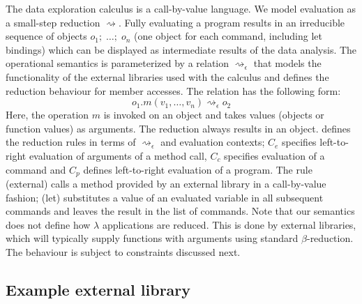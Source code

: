 \documentclass[english,crc,references=cleveref]{programming}
\theoremstyle{plain}
\theoremstyle{definition}
\newcommand{\rname}[1]{{\sffamily(#1)}}
\begin{document}
The data exploration calculus is a call-by-value language. We model evaluation as a small-step
reduction $\rightsquigarrow$. Fully evaluating a program results in an irreducible sequence of
objects $o_1;\; \ldots;\; o_n$ (one object for each command, including let bindings) which can be
displayed as intermediate results of the data analysis. The operational semantics is parameterized
by a relation $\rightsquigarrow_\epsilon$ that models the functionality of the external libraries
used with the calculus and defines the reduction behaviour for member accesses. The relation has the
following form:
%
\begin{equation*}
o_1.m(v_1, \ldots, v_n) \rightsquigarrow_\epsilon o_2
\end{equation*}
%
Here, the operation $m$ is invoked on an object and takes values (objects or function values) as arguments.
The reduction always results in an object.
 defines the reduction rules in terms of $\rightsquigarrow_\epsilon$
and evaluation contexts; $C_e$ specifies left-to-right evaluation of arguments of a method call,
$C_c$ specifies evaluation of a command and $C_p$ defines left-to-right evaluation of a program.
The rule \rname{external} calls a method provided by an external library in a
call-by-value fashion; \rname{let} substitutes a value of an evaluated variable in
all subsequent commands and leaves the result in the list of commands.
Note that our semantics does not define how $\lambda$ applications are reduced. This is done by
external libraries, which will typically supply functions with arguments using standard $\beta$-reduction.
The behaviour is subject to constraints discussed next.

\subsection{Example external library}
\label{sec:calculus-example}
\end{document}

